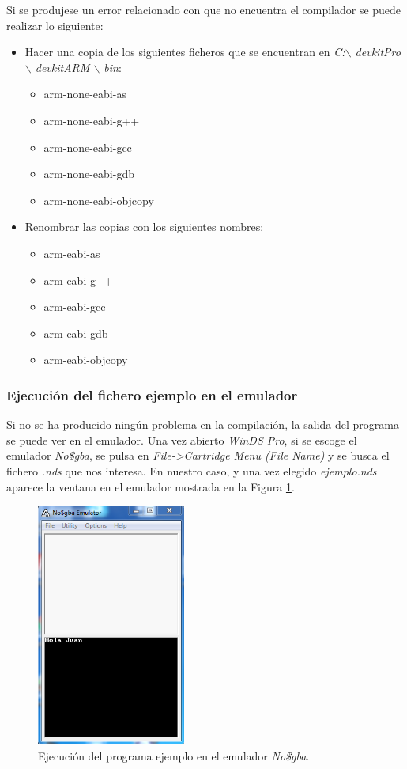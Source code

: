 Si se produjese un error relacionado con que no encuentra el compilador se puede realizar lo siguiente:
\begin{itemize}
\item Hacer una copia de los siguientes ficheros que se encuentran en \textit{C:$\backslash$ devkitPro $\backslash$ devkitARM $\backslash$ bin}:	
	\begin{itemize}
 		\item arm-none-eabi-as
 		\item arm-none-eabi-g++
	 	\item arm-none-eabi-gcc	
 		\item arm-none-eabi-gdb
	   \item arm-none-eabi-objcopy
	\end{itemize}
\item Renombrar las copias con los siguientes nombres:	
	\begin{itemize}
		\item arm-eabi-as
	 	\item arm-eabi-g++
	 	\item arm-eabi-gcc	
 		\item arm-eabi-gdb
	   \item arm-eabi-objcopy
	\end{itemize}
\end{itemize}

\subsubsection{Ejecución del fichero ejemplo en el emulador}
Si no se ha producido ningún problema en la compilación, la salida del programa se puede ver en el emulador. Una vez abierto \textit{WinDS Pro}, si se escoge el emulador \textit{No\$gba}, se pulsa en \textit{File->Cartridge Menu (File Name)} y se busca el fichero \textit{.nds} que nos interesa. En nuestro caso, y una vez elegido \textit{ejemplo.nds} aparece la ventana en el emulador mostrada en la Figura \ref{fig_c2_eclipse11b}.

\begin{figure}[h]
\centering
\includegraphics[height=8cm]{./Figuras/C2/c2_eclipse11b.png}
\caption{Ejecución del programa ejemplo en el emulador \textit{No\$gba}.}
\label{fig_c2_eclipse11b}
\end{figure}

